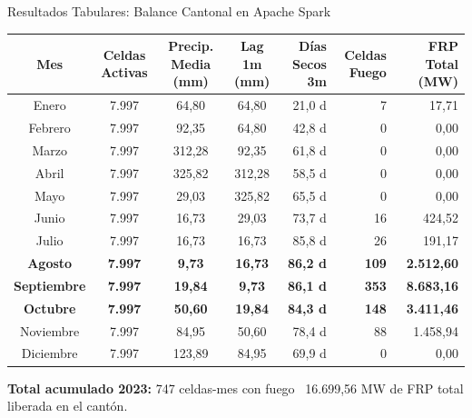 \documentclass[aspectratio=169,11pt]{beamer}
\newcommand{\seccionactual}{Sustentaci\'on Final}
\begin{document}
\renewcommand{\seccionactual}{Tablas Spark}
\begin{frame}{Resultados Tabulares: Balance Cantonal en Apache Spark}
  \scriptsize
  \begin{table}[H]
    \centering
    \begin{tabular}{@{}ccccrrr@{}}
      \toprule
      \textbf{Mes} & \textbf{Celdas Activas} & \textbf{Precip. Media (mm)} & \textbf{Lag 1m (mm)} & \textbf{D\'ias Secos 3m} & \textbf{Celdas Fuego} & \textbf{FRP Total (MW)} \\
      \midrule
      Enero       & 7.997 & 64,80  & 64,80  & 21,0 d & 7   & 17,71 \\
      Febrero     & 7.997 & 92,35  & 64,80  & 42,8 d & 0   & 0,00 \\
      Marzo       & 7.997 & 312,28 & 92,35  & 61,8 d & 0   & 0,00 \\
      Abril       & 7.997 & 325,82 & 312,28 & 58,5 d & 0   & 0,00 \\
      Mayo        & 7.997 & 29,03  & 325,82 & 65,5 d & 0   & 0,00 \\
      Junio       & 7.997 & 16,73  & 29,03  & 73,7 d & 16  & 424,52 \\
      Julio       & 7.997 & 16,73  & 16,73  & 85,8 d & 26  & 191,17 \\
      \rowcolor{FuegoPalido}
      \textbf{Agosto}     & \textbf{7.997} & \textbf{9,73}   & \textbf{16,73}  & \textbf{86,2 d} & \textbf{109} & \textbf{2.512,60} \\
      \rowcolor{FuegoPalido}
      \textbf{Septiembre} & \textbf{7.997} & \textbf{19,84}  & \textbf{9,73}   & \textbf{86,1 d} & \textbf{353} & \textbf{8.683,16} \\
      \rowcolor{FuegoPalido}
      \textbf{Octubre}    & \textbf{7.997} & \textbf{50,60}  & \textbf{19,84}  & \textbf{84,3 d} & \textbf{148} & \textbf{3.411,46} \\
      Noviembre   & 7.997 & 84,95  & 50,60  & 78,4 d & 88  & 1.458,94 \\
      Diciembre   & 7.997 & 123,89 & 84,95  & 69,9 d & 0   & 0,00 \\
      \bottomrule
    \end{tabular}
  \end{table}
  \centering\tiny\textbf{Total acumulado 2023:} 747 celdas-mes con fuego \textbar\ 16.699,56 MW de FRP total liberada en el cant\'on.
\end{frame}
\end{document}
